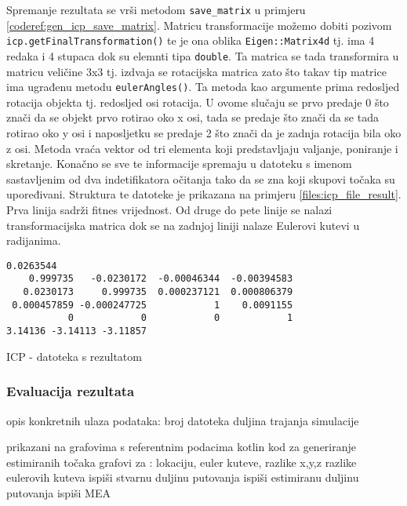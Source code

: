 Spremanje rezultata se vrši metodom \texttt{save_matrix} u primjeru \ref{coderef:gen_icp_save_matrix}. Matricu transformacije možemo dobiti pozivom \texttt{icp.getFinalTransformation()} te je ona oblika \texttt{Eigen::Matrix4d} tj. ima 4 redaka i 4 stupaca dok su elemnti tipa \texttt{double}. Ta matrica se tada transformira u matricu veličine 3x3 tj. izdvaja se rotacijska matrica zato što takav tip matrice ima ugrađenu metodu \texttt{eulerAngles()}. Ta metoda kao argumente prima redosljed rotacija objekta tj. redosljed osi rotacija. U ovome slučaju se prvo predaje 0 što znači da se objekt prvo rotirao oko x osi, tada se predaje što znači da se tada rotirao oko y osi i naposljetku se predaje 2 što znači da je zadnja rotacija bila oko z osi. Metoda vraća vektor od tri elementa koji predstavljaju valjanje, poniranje i skretanje. Konačno se sve te informacije spremaju u datoteku s imenom sastavljenim od dva indetifikatora očitanja tako da se zna koji skupovi točaka su upoređivani. Struktura te datoteke je prikazana na primjeru  \ref{files:icp_file_result}. Prva linija sadrži fitnes vrijednost. Od druge do pete linije se nalazi transformacijska matrica dok se na zadnjoj liniji nalaze Eulerovi kutevi u radijanima.
\begin{listing}[h!]
  \begin{verbatim}
0.0263544
    0.999735   -0.0230172  -0.00046344  -0.00394583
   0.0230173     0.999735  0.000237121  0.000806379
 0.000457859 -0.000247725            1    0.0091155
           0            0            0            1
3.14136 -3.14113 -3.11857
  \end{verbatim}
  \caption{ICP - datoteka s rezultatom}
  \label{files:icp_file_result}
\end{listing}

\subsubsection{Evaluacija rezultata}
opis konkretnih ulaza podataka:
  broj datoteka
  duljina trajanja simulacije

prikazani na grafovima s referentnim podacima
kotlin kod za generiranje estimiranih točaka
grafovi za :
  lokaciju,
  euler kuteve,
  razlike x,y,z
  razlike eulerovih kuteva
ispiši stvarnu duljinu putovanja
ispiši estimiranu duljinu putovanja
ispiši MEA